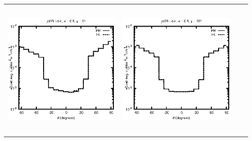 \begin{tabular}{c c c c}
\includegraphics[height=7cm]{../eps/jol08_Ld_ir_fwd.eps} &
\includegraphics[height=7cm]{../eps/jol08_Ld_ir_cross.eps} \\
\end{tabular}

\pagebreak

